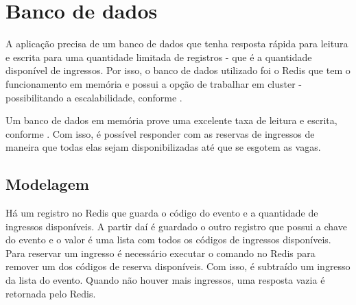 \section{Banco de dados}\label{banco-de-dados}

A aplicação precisa de um banco de dados que tenha resposta rápida para leitura e
escrita para uma quantidade limitada de registros - que é a quantidade disponível
de ingressos. Por isso, o banco de dados utilizado foi o Redis que tem o funcionamento
em memória e possui a opção de trabalhar em cluster - possibilitando a escalabilidade,
conforme .


Um banco de dados em memória prove uma excelente taxa de leitura e escrita, conforme
.
Com isso, é possível responder com as reservas de ingressos de maneira que todas elas
sejam disponibilizadas até que se esgotem as vagas.

\subsection{Modelagem}

Há um registro no Redis que guarda o código do evento e a quantidade de ingressos
disponíveis. A partir daí é guardado o outro registro que possui a chave do evento
e o valor é uma lista com todos os códigos de ingressos disponíveis. Para reservar
um ingresso é necessário executar o comando no Redis para remover um dos códigos
de reserva disponíveis. Com isso, é subtraído um ingresso da lista do evento. Quando
não houver mais ingressos, uma resposta vazia é retornada pelo Redis.
